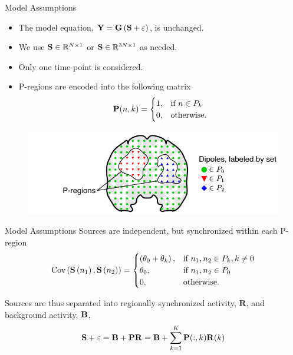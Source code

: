 \documentclass[progressbar=head]{beamer}
\begin{document}
\begin{frame}{Model Assumptions}
\begin{itemize}
\item The model equation, $\mathbf{Y} = \mathbf{G} \left( \mathbf{S} + \varepsilon \right)$, is unchanged. 
\item We use $\mathbf{S} \in \mathbb{R}^{N\times 1}$ or $\mathbf{S} \in \mathbb{R}^{3N\times 1}$ as needed. 
\item Only one time-point is considered.
\item P-regions are encoded into the following matrix
\begin{equation}
\mathbf{P}(n,k) = \begin{cases}
1, &\text{if } n\in P_k \\
0, &\text{otherwise}.
\end{cases}
\end{equation}
\end{itemize}

\begin{figure}
\centering
\includegraphics[width=0.65\linewidth]{./img/Pregions_pic}
\end{figure}
\end{frame}

\begin{frame}{Model Assumptions}
Sources are independent, but synchronized within each P-region
\begin{equation}
\text{Cov}\left( \mathbf{S}\left( n_1 \right), \mathbf{S}\left( n_2 \right) \right)
=
\begin{cases}
\left( \theta_0+\theta_k \right), &\text{if } n_1, n_2 \in P_k, k\neq 0 \\
\theta_0, &\text{if } n_1, n_2 \in P_0 \\
0, &\text{otherwise}.
\end{cases}
\end{equation}

Sources are thus separated into regionally synchronized activity, $\mathbf{R}$, and background activity, $\mathbf{B}$,
\begin{equation}
    {\mathbf{S}} + \varepsilon = {\mathbf{B}} + \mathbf{P} {\mathbf{R}}
    = {\mathbf{B}} + \sum_{k=1}^K \mathbf{P}(:,k) {\mathbf{R}}(k)
\end{equation}
\end{frame}
\end{document}
